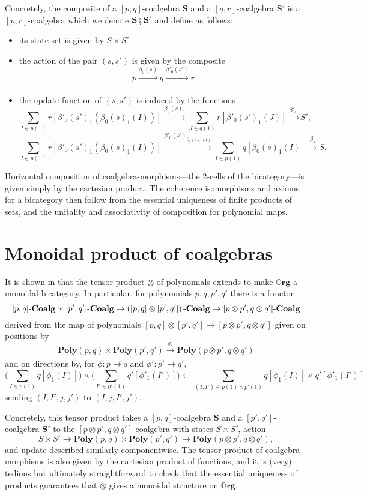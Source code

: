 \documentclass[11pt, one side, article]{memoir}
\theoremstyle{definition}
\theoremstyle{plain}
\newcommand{\Cat}[1]{\mathbf{#1}}%
\newcommand{\then}{\mathbin{\fatsemi}}
\newcommand{\To}[2][]{\xrightarrow[#1]{#2}}
\newcommand{\fromm}{\longleftarrow}
\newcommand{\tn}[1]{\textnormal{#1}}
\newcommand{\poly}{\Cat{Poly}}
\newcommand{\0}{\textsf{0}}
\newcommand{\1}{\tn{\textsf{1}}}
\newcommand{\coalg}{\tn{-}\Cat{Coalg}}
\newcommand{\org}{{\mathbb{O}\Cat{rg}}}
\renewcommand{\S}{{\Cat{S}}}
\begin{document}
Concretely, the composite of a $[p,q]$-coalgebra $\S$ and a $[q,r]$-coalgebra $\S'$ is a $[p,r]$-coalgebra which we denote $\S\then\S'$  and define as follows:
\begin{itemize}
	\item its state set is given by $S \times S'$
	\item the action of the pair $(s,s')$ is given by the composite 
\[p \To{\beta_0(s)} q \To{\beta'_0(s')} r\]
	\item the update function of $(s,s')$ is induced by the functions
\[\sum_{I \in p(1)} r[\beta'_0(s')_1(\beta_0(s)_1(I))] \To{\beta_0(s)_1} \sum_{J \in q(1)} r[\beta'_0(s')_1(J)] \To{\beta'_{s'}} S',\]
\[\sum_{I \in p(1)} r[\beta'_0(s')_1(\beta_0(s)_1(I))] \To{\beta'_0(s')_{\beta_0(s)_1(I)}} \sum_{I \in p(1)} q[\beta_0(s)_1(I)] \To{\beta_s} S.\]%
\end{itemize}
Horizontal composition of coalgebra-morphisms---the 2-cells of the bicategory---is given simply by the cartesian product. The coherence isomorphisms and axioms for a bicategory then follow from the essential uniqueness of finite products of sets, and the unitality and associativity of composition for polynomial maps.%



\section{Monoidal product of coalgebras}


It is shown in \cite[Proposition 2.13]{spivak2021learners} that the tensor product $\otimes$ of polynomials extends to make $\org$ a monoidal bicategory. In particular, for polynomials $p,q,p',q'$ there is a functor
\[[p,q]\coalg \times [p',q']\coalg \to \left([p,q] \otimes [p',q']\right)\coalg \to [p \otimes p',q \otimes q']\coalg\]
derived from the map of polynomials $[p,q] \otimes [p',q'] \to [p {\otimes} p',q {\otimes} q']$ given on positions by 
\[\poly(p,q) \times \poly(p',q') \To{\otimes} \poly(p \otimes p',q \otimes q')\]
and on directions by, for $\phi\colon p \to q$ and $\phi'\colon p' \to q'$,
\[\bigg(\sum_{I \in p(1)} q[\phi_1(I)]\bigg) \times \bigg(\sum_{I' \in p'(1)} q'[\phi'_1(I')]\bigg) \fromm \sum_{(I,I') \in p(1) \times p'(1)} q[\phi_1(I)] \times q'[\phi'_1(I')]\]
sending $(I,I',j,j')$ to $(I,j,I',j')$.

Concretely, this tensor product takes a $[p,q]$-coalgebra $\S$ and a $[p',q']$-coalgebra $\S'$ to the $[p \otimes p',q \otimes q']$-coalgebra with states $S \times S'$, action
\[S \times S' \to \poly(p,q) \times \poly(p',q') \to \poly(p \otimes p',q \otimes q'),\]
and update described similarly componentwise. The tensor product of coalgebra morphisms is also given by the cartesian product of functions, and it is (very) tedious but ultimately straightforward to check that the essential uniqueness of products guarantees that $\otimes$ gives a monoidal structure on $\org$.
\end{document}
